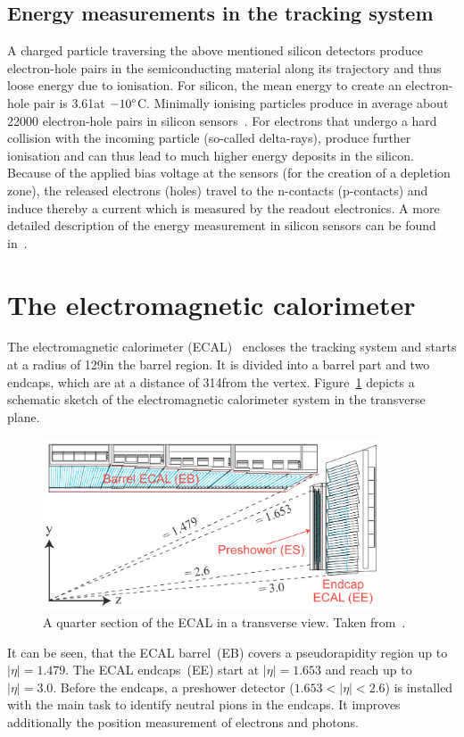 \subsection*{Energy measurements in the tracking system}
A charged particle traversing the above mentioned silicon detectors produce electron-hole pairs in the semiconducting material along its trajectory and thus loose energy due to ionisation.
For silicon, the mean energy to create an electron-hole pair is 3.61\ev at $-10\degree$C.
Minimally ionising particles produce in average about 22000 electron-hole pairs in silicon sensors~\cite{Thesis_Jenny}.
For electrons that undergo a hard collision with the incoming particle (so-called delta-rays), produce further ionisation and can thus lead to much higher energy deposits in the silicon.
Because of the applied bias voltage at the sensors (for the creation of a depletion zone), the released electrons (holes) travel to the n-contacts (p-contacts) and induce thereby a current which is measured by the readout electronics. 
A more detailed description of the energy measurement in silicon sensors can be found in~\cite{Thesis_Jenny}.

\section{The electromagnetic calorimeter}
The electromagnetic calorimeter (ECAL)~\cite{bib:CMS:TDR_2006,bib:CMS:TDR_ECAL} encloses the tracking system and starts at a radius of 129\cm in the barrel region.
It is divided into a barrel part and two endcaps, which are at a distance of 314\cm from the vertex.
Figure~\ref{fig:ECAL} depicts a schematic sketch of the electromagnetic calorimeter system in the transverse plane.
\begin{figure}[!h]
  \centering
      \includegraphics[width=0.89\textwidth]{figures/experiment/CMS/Figures_Experimental_Apparatus_ECALRapidity.png}
  \caption{A quarter section of the ECAL in a transverse view. Taken from~\cite{bib:CMS:TDR_2006}.}  
  \label{fig:ECAL}
\end{figure}
It can be seen, that the ECAL barrel~(EB) covers a pseudorapidity region up to $|\eta|=1.479$.
The ECAL endcaps~(EE) start at $|\eta|=1.653$ and reach up to $|\eta|=3.0$.
Before the endcaps, a preshower detector ($1.653<|\eta|<2.6$) is installed with the main task to identify neutral pions in the endcaps.
It improves additionally the position measurement of electrons and photons.


